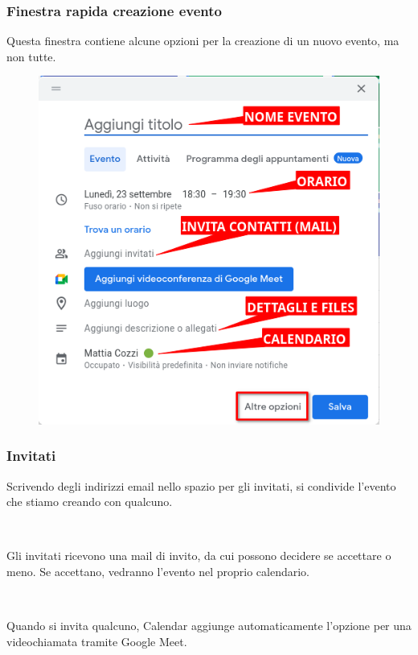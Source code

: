 \documentclass[]{beamer}
\begin{document}
\begin{frame}
\frametitle{Finestra rapida creazione evento}
Questa finestra contiene alcune opzioni per la creazione di un nuovo evento, ma non tutte.

\begin{figure}
  \includegraphics[width=.5\columnwidth]{img/calendarcrea2.png}
\end{figure}
\end{frame}

\begin{frame}
\frametitle{Invitati}
Scrivendo degli indirizzi email nello spazio per gli invitati, si condivide l'evento che stiamo creando con qualcuno.

~

Gli invitati ricevono una mail di invito, da cui possono decidere se accettare o meno. Se accettano, vedranno l'evento nel proprio calendario.

~

Quando si invita qualcuno, Calendar aggiunge automaticamente l'opzione per una videochiamata tramite Google Meet.
\end{frame}
\end{document}
